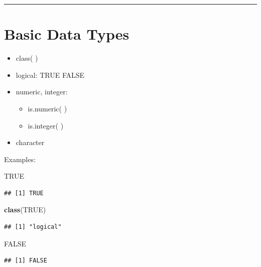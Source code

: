\documentclass[]{book}
\newenvironment{Shaded}{\begin{snugshade}}{\end{snugshade}}
\newcommand{\KeywordTok}[1]{\textcolor[rgb]{0.13,0.29,0.53}{\textbf{{#1}}}}
\newcommand{\OtherTok}[1]{\textcolor[rgb]{0.56,0.35,0.01}{{#1}}}
\newcommand{\NormalTok}[1]{{#1}}
\providecommand{\tightlist}{%
  \setlength{\itemsep}{0pt}\setlength{\parskip}{0pt}}
\begin{document}
\begin{center}\rule{0.5\linewidth}{\linethickness}\end{center}

\section{Basic Data Types}\label{basic-data-types}

\begin{itemize}
\tightlist
\item
  class( )
\item
  logical: TRUE FALSE
\item
  numeric, integer:

  \begin{itemize}
  \tightlist
  \item
    is.numeric( )
  \item
    is.integer( )\\
  \end{itemize}
\item
  character
\end{itemize}

Examples:

\begin{Shaded}
\begin{Highlighting}[]
\OtherTok{TRUE}
\end{Highlighting}
\end{Shaded}

\begin{verbatim}
## [1] TRUE
\end{verbatim}

\begin{Shaded}
\begin{Highlighting}[]
\KeywordTok{class}\NormalTok{(}\OtherTok{TRUE}\NormalTok{)}
\end{Highlighting}
\end{Shaded}

\begin{verbatim}
## [1] "logical"
\end{verbatim}

\begin{Shaded}
\begin{Highlighting}[]
\OtherTok{FALSE}
\end{Highlighting}
\end{Shaded}

\begin{verbatim}
## [1] FALSE
\end{verbatim}
\end{document}
